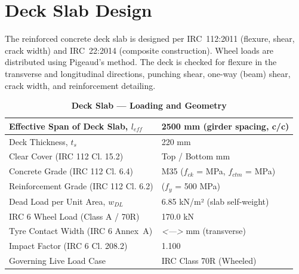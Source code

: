 \documentclass[12pt,a4paper]{report}
\numberwithin{table}{chapter}
\numberwithin{figure}{chapter}
\newcommand{\placeholder}[1]{\textit{\textless #1\textgreater}}
\begin{document}
\section{Deck Slab Design}
\label{sec:deck-design}

The reinforced concrete deck slab is designed per IRC~112:2011 (flexure, shear, crack width) and IRC~22:2014 (composite construction). Wheel loads are distributed using Pigeaud's method. The deck is checked for flexure in the transverse and longitudinal directions, punching shear, one-way (beam) shear, crack width, and reinforcement detailing.

\vspace{1em}
\begin{longtable}{|L{5.5cm}|p{10.0cm}|}
\caption{\textbf{Deck Slab --- Loading and Geometry}}
\hline
\textnormal{Effective Span of Deck Slab, $l_{eff}$} & 2500 mm (girder spacing, c/c) \\[6pt]
\hline
\textnormal{Deck Thickness, $t_s$} & 220 mm \\[6pt]
\hline
\textnormal{Clear Cover (IRC 112 Cl. 15.2)} & Top  / Bottom  mm \\[6pt]
\hline
\textnormal{Concrete Grade (IRC 112 Cl. 6.4)} & M35 ($f_{ck}$ =  MPa, $f_{ctm}$ =  MPa) \\[6pt]
\hline
\textnormal{Reinforcement Grade (IRC 112 Cl. 6.2)} &  ($f_y$ = 500 MPa) \\[6pt]
\hline
\textnormal{Dead Load per Unit Area, $w_{DL}$} & 6.85 kN/m² (slab self-weight) \\[6pt]
\hline
\textnormal{IRC 6 Wheel Load (Class A / 70R)} & 170.0 kN \\[6pt]
\hline
\textnormal{Tyre Contact Width (IRC 6 Annex~A)} & \placeholder{---} mm (transverse) \\[6pt]
\hline
\textnormal{Impact Factor (IRC 6 Cl. 208.2)} & 1.100 \\[6pt]
\hline
\textnormal{Governing Live Load Case} & IRC Class 70R (Wheeled) \\[6pt]
\hline
\end{longtable}
\end{document}
